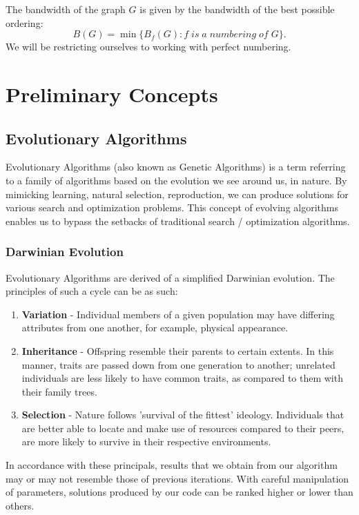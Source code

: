 \documentclass[conference,compsoc]{IEEEtran}
\begin{document}
The bandwidth of the graph $G$ is given by the bandwidth of the best possible ordering:
\begin{equation}
B(G) = \min\{B_f(G): f\; is\; a \;numbering\; of\; G\}.    
\end{equation}
We will be restricting ourselves to working with perfect numbering.

\section{Preliminary Concepts}
\subsection{Evolutionary Algorithms}
Evolutionary Algorithms (also known as Genetic Algorithms) is a term referring to a 
family of algorithms based on the evolution we see around us, in nature. By mimicking learning, 
natural selection, reproduction, we can produce solutions for various search and optimization problems. 
This concept of evolving algorithms enables us to bypass the setbacks of traditional search / optimization algorithms.

\subsubsection{Darwinian Evolution}
Evolutionary Algorithms are derived of a simplified Darwinian evolution. The principles of such a cycle can be as such:
\begin{enumerate}
    \item \textbf{Variation} - Individual members of a given population may have differing attributes 
    from one another, for example, physical appearance.
    \item \textbf{Inheritance} - Offspring resemble their parents to certain extents. 
    In this manner, traits are passed down from one generation to another; unrelated individuals are less likely to have common traits, as compared to them with their family trees.
    \item \textbf{Selection} - Nature follows 'survival of the fittest' ideology. Individuals that 
    are better able to locate and make use of resources compared to their peers, are more likely to survive in their respective environments. 
\end{enumerate}
In accordance with these principals, results that we obtain from our algorithm may or may not resemble those of 
previous iterations. With careful manipulation of parameters, solutions produced by our code can be ranked 
higher or lower than others.
\end{document}

